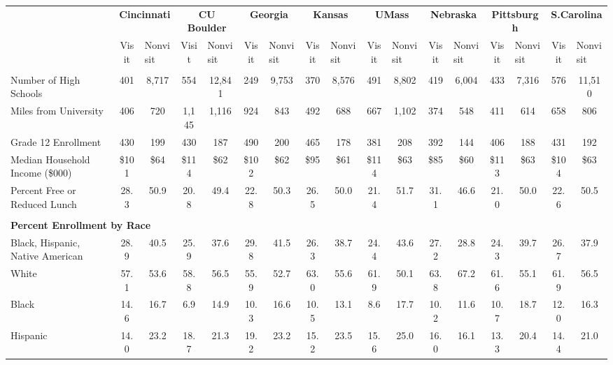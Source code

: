 \begin{tabular*}{\linewidth}{@{\extracolsep{\fill} } lcccccccccccccccc}%
&\multicolumn{2}{c}{\bfseries Cincinnati}&\multicolumn{2}{c}{\bfseries CU Boulder}&\multicolumn{2}{c}{\bfseries Georgia}&\multicolumn{2}{c}{\bfseries Kansas}&\multicolumn{2}{c}{\bfseries UMass}&\multicolumn{2}{c}{\bfseries Nebraska}&\multicolumn{2}{c}{\bfseries Pittsburgh}&\multicolumn{2}{c}{\bfseries S.Carolina}\\%
&Visit&\multicolumn{1}{l}{Nonvisit}&Visit&\multicolumn{1}{l}{Nonvisit}&Visit&\multicolumn{1}{l}{Nonvisit}&Visit&\multicolumn{1}{l}{Nonvisit}&Visit&\multicolumn{1}{l}{Nonvisit}&Visit&\multicolumn{1}{l}{Nonvisit}&Visit&\multicolumn{1}{l}{Nonvisit}&Visit&\multicolumn{1}{l}{Nonvisit}\\%
\hline%
&&&&&&&&&&&&&&&&\\%
\hspace{0cm}Number of High Schools&401&8,717&554&12,841&249&9,753&370&8,576&491&8,802&419&6,004&433&7,316&576&11,510\\%
\hspace{0cm}Miles from University&406&720&1,145&1,116&924&843&492&688&667&1,102&374&548&411&614&658&806\\%
\hspace{0cm}Grade 12 Enrollment&430&199&430&187&490&200&465&178&381&208&392&144&406&188&431&192\\%
\hspace{0cm}Median Household Income (\$000)&\$101&\$64&\$114&\$62&\$102&\$62&\$95&\$61&\$114&\$63&\$85&\$60&\$113&\$63&\$104&\$63\\%
\hspace{0cm}Percent Free or Reduced Lunch&28.3&50.9&20.8&49.4&22.8&50.3&26.5&50.0&21.4&51.7&31.1&46.6&21.0&50.0&22.6&50.5\\%
&&&&&&&&&&&&&&&&\\%
\multicolumn{17}{l}{\bfseries Percent Enrollment by Race}\\%
\hspace{0.2cm}Black, Hispanic, Native American&28.9&40.5&25.9&37.6&29.8&41.5&26.3&38.7&24.4&43.6&27.2&28.8&24.3&39.7&26.7&37.9\\%
\hspace{0.2cm}White&57.1&53.6&58.8&56.5&55.9&52.7&63.0&55.6&61.9&50.1&63.8&67.2&61.6&55.1&61.9&56.5\\%
\hspace{0.2cm}Black&14.6&16.7&6.9&14.9&10.3&16.6&10.5&13.1&8.6&17.7&10.2&11.6&10.7&18.7&12.0&16.3\\%
\hspace{0.2cm}Hispanic&14.0&23.2&18.7&21.3&19.2&23.2&15.2&23.5&15.6&25.0&16.0&16.1&13.3&20.4&14.4&21.0\\%

\end{tabular*}
